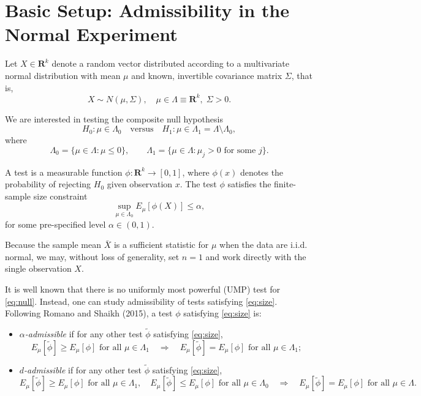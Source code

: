 \documentclass[12pt]{article}
\theoremstyle{definition}
\theoremstyle{remark}
\begin{document}
\section*{Basic Setup: Admissibility in the Normal Experiment}

Let $X \in \mathbf{R}^k$ denote a random vector distributed according to a multivariate normal distribution with mean $\mu$ and known, invertible covariance matrix $\Sigma$, that is,
\[
X \sim N(\mu, \Sigma), \quad \mu \in \Lambda \equiv \mathbf{R}^k, \; \Sigma > 0.
\]

We are interested in testing the composite null hypothesis
\begin{equation} \label{eq:null}
H_0 : \mu \in \Lambda_0 \quad \text{versus} \quad H_1 : \mu \in \Lambda_1 = \Lambda \setminus \Lambda_0,
\end{equation}
where
\[
\Lambda_0 = \{ \mu \in \Lambda : \mu \le 0 \}, \qquad \Lambda_1 = \{ \mu \in \Lambda : \mu_j > 0 \text{ for some } j \}.
\]

A test is a measurable function $\phi : \mathbf{R}^k \to [0,1]$, where $\phi(x)$ denotes the probability of rejecting $H_0$ given observation $x$.  The test $\phi$ satisfies the finite-sample size constraint
\begin{equation} \label{eq:size}
\sup_{\mu \in \Lambda_0} E_\mu[\phi(X)] \leq \alpha,
\end{equation}
for some pre-specified level $\alpha \in (0,1)$.

Because the sample mean $\bar X$ is a sufficient statistic for $\mu$ when the data are i.i.d. normal, we may, without loss of generality, set $n=1$ and work directly with the single observation $X$.

It is well known that there is no uniformly most powerful (UMP) test for \eqref{eq:null}.  Instead, one can study admissibility of tests satisfying \eqref{eq:size}.  Following Romano and Shaikh (2015), a test $\phi$ satisfying \eqref{eq:size} is:
\begin{itemize}
    \item \emph{$\alpha$-admissible} if for any other test $\tilde \phi$ satisfying \eqref{eq:size},
    \[
    E_\mu[\tilde \phi] \ge E_\mu[\phi] \text{ for all } \mu \in \Lambda_1
    \quad \Rightarrow \quad
    E_\mu[\tilde \phi] = E_\mu[\phi] \text{ for all } \mu \in \Lambda_1;
    \]
    \item \emph{$d$-admissible} if for any other test $\tilde \phi$ satisfying \eqref{eq:size},
    \[
    E_\mu[\tilde \phi] \ge E_\mu[\phi] \text{ for all } \mu \in \Lambda_1, \quad
    E_\mu[\tilde \phi] \le E_\mu[\phi] \text{ for all } \mu \in \Lambda_0
    \quad \Rightarrow \quad
    E_\mu[\tilde \phi] = E_\mu[\phi] \text{ for all } \mu \in \Lambda.
    \]
\end{itemize}
\end{document}
